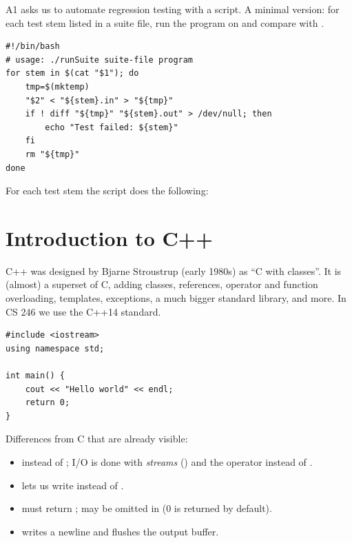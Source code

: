 A1 asks us to automate regression testing with a script. A minimal version: for
each test stem listed in a suite file, run the program on  and
compare with .
\begin{lstlisting}[style=bash]
#!/bin/bash
# usage: ./runSuite suite-file program
for stem in $(cat "$1"); do
    tmp=$(mktemp)
    "$2" < "${stem}.in" > "${tmp}"
    if ! diff "${tmp}" "${stem}.out" > /dev/null; then
        echo "Test failed: ${stem}"
    fi
    rm "${tmp}"
done
\end{lstlisting}
For each test stem the script does the following:
\begin{center}
\end{center}

\section{Introduction to C++}
C++ was designed by Bjarne Stroustrup (early 1980s) as ``C with classes''. It is
(almost) a superset of C, adding classes, references, operator and function
overloading, templates, exceptions, a much bigger standard library, and more.
In CS 246 we use the C++14 standard.

\begin{lstlisting}[style=cpp]
#include <iostream>
using namespace std;

int main() {
    cout << "Hello world" << endl;
    return 0;
}
\end{lstlisting}

Differences from C that are already visible:
\begin{itemize}
  \item {} instead of ; I/O is done with
        \emph{streams} () and the operator \code{<<} instead of
        .
  \item {} lets us write  instead of
        .
  \item {} must return ;  may be omitted in
         (0 is returned by default).
  \item {} writes a newline and flushes the output buffer.
\end{itemize}

